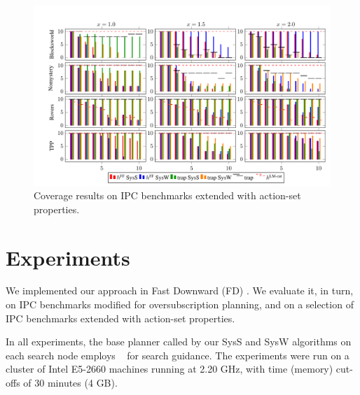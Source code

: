 

\newcommand{\scatterplotsize}{8cm}
\newcommand{\scatterplotxlabelshift}{1.5ex}
\newcommand{\scatterplotylabelshift}{-3ex}




\begin{figure}[htb]
\centering\centering
%
\includegraphics{data/action_set_properties/barchart/barchart.pdf}
\vspace{-0.6cm}
\caption{Coverage results on IPC benchmarks extended with action-set properties.}
\label{fig:barcharts}
\vspace{-0.2cm}
\end{figure}


\section{Experiments}
\label{experiments}

We implemented our approach in Fast Downward
(FD) \cite{helmert:jair-06}. We evaluate it, in turn, on IPC
benchmarks modified for oversubscription planning, and on a selection
of IPC benchmarks extended with action-set properties.

In all experiments, the base planner called by our SysS and SysW
algorithms on each search node
employs \hff\ \cite{hoffmann:nebel:jair-01} for search guidance.
%
%
The experiments were run on a cluster of Intel E5-2660 machines
running at 2.20 GHz, with time (memory) cut-offs of 30 minutes (4
GB).



